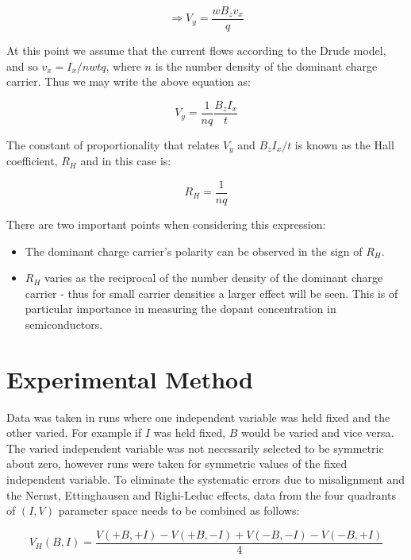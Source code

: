 \documentclass{article}
\begin{document}
		\begin{equation}
			\Rightarrow V_y = \frac{wB_zv_x}{q}
		\end{equation}
		
		\noindent At this point we assume that the current flows according to the Drude model, and so $v_x = I_x/nwtq$, where $n$ is the number density of the dominant charge carrier. Thus we may write the above equation as:
		
		\begin{equation}
			V_y = \frac{1}{nq}\frac{B_zI_x}{t}
		\end{equation}
		
		\noindent The constant of proportionality that relates $V_y$ and $B_zI_x/t$ is known as the Hall coefficient, $R_H$ and in this case is:
		
		\begin{equation}
			R_H = \frac{1}{nq}
		\end{equation}
		
		\noindent There are two important points when considering this expression:
		
		\begin{itemize}
			\item The dominant charge carrier's polarity can be observed in the sign of $R_H$.
			\item $R_H$ varies as the reciprocal of the number density of the dominant charge carrier - thus for small carrier densities a larger effect will be seen. This is of particular importance in measuring the dopant concentration in semiconductors.
		\end{itemize}
		
	\section{Experimental Method}
		Data was taken in runs where one independent variable was held fixed and the other varied. For example if $I$ was held fixed, $B$ would be varied and vice versa. The varied independent variable was not necessarily selected to be symmetric about zero, however runs were taken for symmetric values of the fixed independent variable. To eliminate the systematic errors due to misalignment and the Nernst, Ettinghausen and Righi-Leduc effects, data from the four quadrants of $(I,V)$ parameter space needs to be combined as follows:
		
		\begin{equation} \label{eq:removeErrors}
			V_H(B,I) = \frac{V(+B,+I)-V(+B,-I)+V(-B,-I)-V(-B,+I)}{4}
		\end{equation}
		
\end{document}
